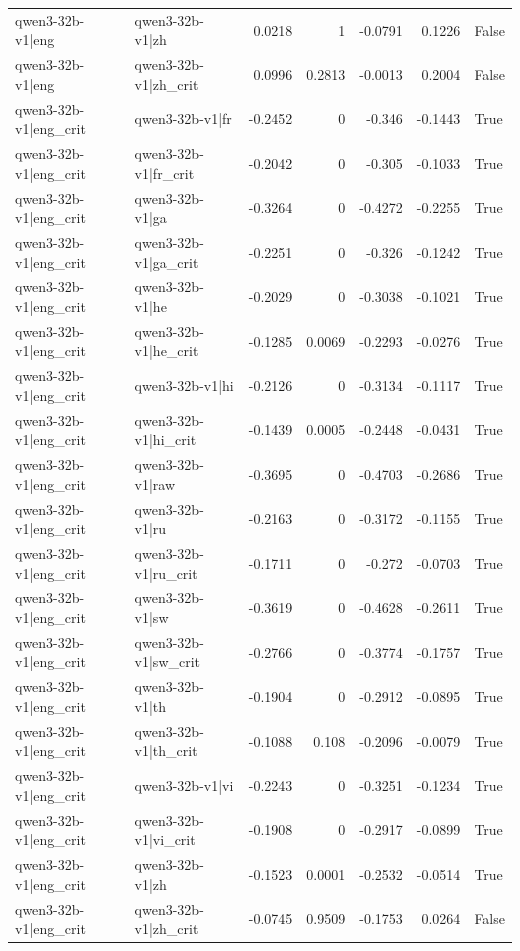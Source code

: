 \begin{table}
\begin{tabular}{l l r r r r l}
qwen3-32b-v1|eng & qwen3-32b-v1|zh & 0.0218 & 1 & -0.0791 & 0.1226 & False \\
qwen3-32b-v1|eng & qwen3-32b-v1|zh_crit & 0.0996 & 0.2813 & -0.0013 & 0.2004 & False \\
qwen3-32b-v1|eng_crit & qwen3-32b-v1|fr & -0.2452 & 0 & -0.346 & -0.1443 & True \\
qwen3-32b-v1|eng_crit & qwen3-32b-v1|fr_crit & -0.2042 & 0 & -0.305 & -0.1033 & True \\
qwen3-32b-v1|eng_crit & qwen3-32b-v1|ga & -0.3264 & 0 & -0.4272 & -0.2255 & True \\
qwen3-32b-v1|eng_crit & qwen3-32b-v1|ga_crit & -0.2251 & 0 & -0.326 & -0.1242 & True \\
qwen3-32b-v1|eng_crit & qwen3-32b-v1|he & -0.2029 & 0 & -0.3038 & -0.1021 & True \\
qwen3-32b-v1|eng_crit & qwen3-32b-v1|he_crit & -0.1285 & 0.0069 & -0.2293 & -0.0276 & True \\
qwen3-32b-v1|eng_crit & qwen3-32b-v1|hi & -0.2126 & 0 & -0.3134 & -0.1117 & True \\
qwen3-32b-v1|eng_crit & qwen3-32b-v1|hi_crit & -0.1439 & 0.0005 & -0.2448 & -0.0431 & True \\
qwen3-32b-v1|eng_crit & qwen3-32b-v1|raw & -0.3695 & 0 & -0.4703 & -0.2686 & True \\
qwen3-32b-v1|eng_crit & qwen3-32b-v1|ru & -0.2163 & 0 & -0.3172 & -0.1155 & True \\
qwen3-32b-v1|eng_crit & qwen3-32b-v1|ru_crit & -0.1711 & 0 & -0.272 & -0.0703 & True \\
qwen3-32b-v1|eng_crit & qwen3-32b-v1|sw & -0.3619 & 0 & -0.4628 & -0.2611 & True \\
qwen3-32b-v1|eng_crit & qwen3-32b-v1|sw_crit & -0.2766 & 0 & -0.3774 & -0.1757 & True \\
qwen3-32b-v1|eng_crit & qwen3-32b-v1|th & -0.1904 & 0 & -0.2912 & -0.0895 & True \\
qwen3-32b-v1|eng_crit & qwen3-32b-v1|th_crit & -0.1088 & 0.108 & -0.2096 & -0.0079 & True \\
qwen3-32b-v1|eng_crit & qwen3-32b-v1|vi & -0.2243 & 0 & -0.3251 & -0.1234 & True \\
qwen3-32b-v1|eng_crit & qwen3-32b-v1|vi_crit & -0.1908 & 0 & -0.2917 & -0.0899 & True \\
qwen3-32b-v1|eng_crit & qwen3-32b-v1|zh & -0.1523 & 0.0001 & -0.2532 & -0.0514 & True \\
qwen3-32b-v1|eng_crit & qwen3-32b-v1|zh_crit & -0.0745 & 0.9509 & -0.1753 & 0.0264 & False \\

\end{tabular}
\end{table}
